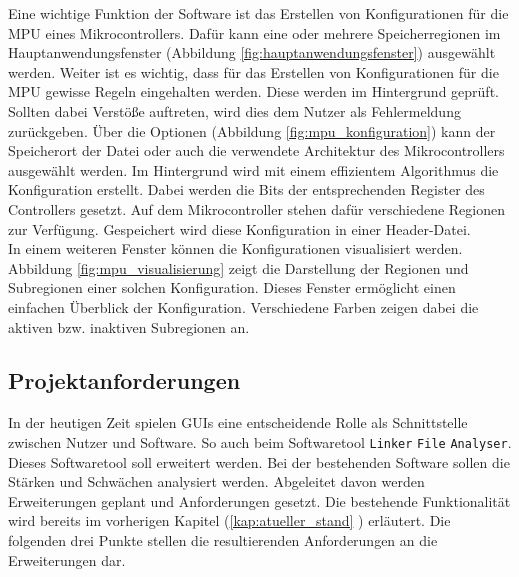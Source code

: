 Eine wichtige Funktion der Software ist das Erstellen von Konfigurationen für die \ac{MPU} eines Mikrocontrollers.
Dafür kann eine oder mehrere Speicherregionen im Hauptanwendungsfenster (Abbildung \ref{fig:hauptanwendungsfenster}) ausgewählt werden.
Weiter ist es wichtig, dass für das Erstellen von Konfigurationen für die \acs{MPU} gewisse Regeln eingehalten werden. 
Diese werden im Hintergrund geprüft.
Sollten dabei Verstöße auftreten, wird dies dem Nutzer als Fehlermeldung zurückgeben.
Über die Optionen (Abbildung \ref{fig:mpu_konfiguration}) kann der Speicherort der Datei oder auch die verwendete Architektur des Mikrocontrollers ausgewählt werden.
Im Hintergrund wird mit einem effizientem Algorithmus die Konfiguration erstellt.
Dabei werden die Bits der entsprechenden Register des Controllers gesetzt. 
Auf dem Mikrocontroller stehen dafür verschiedene Regionen zur Verfügung.
Gespeichert wird diese Konfiguration in einer Header-Datei.\\

In einem weiteren Fenster können die Konfigurationen visualisiert werden.
Abbildung \ref{fig:mpu_visualisierung} zeigt die Darstellung der Regionen und Subregionen einer solchen Konfiguration.
Dieses Fenster ermöglicht einen einfachen Überblick der Konfiguration.
Verschiedene Farben zeigen dabei die aktiven bzw. inaktiven Subregionen an. \\

\subsection{Projektanforderungen}\label{kap:projektanforderungen}
In der heutigen Zeit spielen \ac{GUI}s eine entscheidende Rolle als Schnittstelle zwischen Nutzer und Software.
So auch beim Softwaretool \verb*|Linker| \verb*|File| \verb*|Analyser|.
Dieses Softwaretool soll erweitert werden.
Bei der bestehenden Software sollen die Stärken und Schwächen analysiert werden.
Abgeleitet davon werden Erweiterungen geplant und Anforderungen gesetzt.
Die bestehende Funktionalität wird bereits im vorherigen Kapitel (\ref{kap:atueller_stand} ) erläutert.
Die folgenden drei Punkte stellen die resultierenden Anforderungen an die Erweiterungen dar. \\

